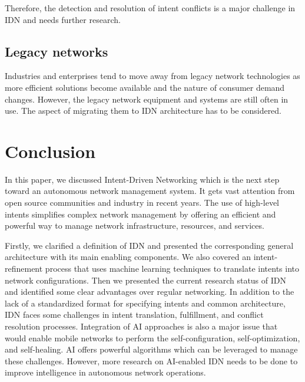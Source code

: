 Therefore, the detection and resolution of intent conflicts is a major challenge in IDN and needs further research.


\subsection{Legacy networks}
Industries and enterprises tend to move away from legacy network technologies as more efficient solutions become available and the nature of consumer demand changes. However, the legacy network equipment and systems are still often in use. The aspect of migrating them to IDN architecture has to be considered.\cite{Saha2018}


\section{Conclusion}
\label{sec:Conclusion}

In this paper, we discussed Intent-Driven Networking which is the next step toward an autonomous network management system. It gets vast attention from open source communities and industry in recent years. The use of high-level intents simplifies complex network management by offering an efficient and powerful way to manage network infrastructure, resources, and services.

Firstly, we clarified a definition of IDN and presented the corresponding general architecture with its main enabling components. We also covered an intent-refinement process that uses machine learning techniques to translate intents into network configurations. Then we presented the current research status of IDN and identified some clear advantages over regular networking. In addition to the lack of a standardized format for specifying intents and common architecture, IDN faces some challenges in intent translation, fulfillment, and conflict resolution processes. Integration of AI approaches is also a major issue that would enable mobile networks to perform the self-configuration, self-optimization, and self-healing. AI offers powerful algorithms which can be leveraged to manage these challenges. However, more research on AI-enabled IDN needs to be done to improve intelligence in autonomous network operations.

\printbibliography[heading=bibintoc]





